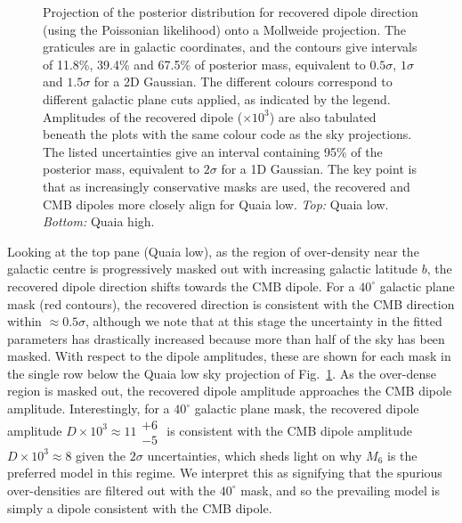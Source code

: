 \documentclass[fleqn,usenatbib]{mnras}
\begin{document}
\begin{figure}
{\begin{tabular}
            \end{tabular}
        }\vspace{2mm}
        \caption{Projection of the posterior distribution for recovered dipole direction (using the Poissonian likelihood) onto a Mollweide projection. The graticules are in galactic coordinates, and the contours give intervals of 11.8\%, 39.4\% and 67.5\% of posterior mass, equivalent to $0.5\sigma$, $1\sigma$ and $1.5\sigma$ for a 2D Gaussian. The different colours correspond to different galactic plane cuts applied, as indicated by the legend. Amplitudes of the recovered dipole ($\times 10^3$) are also tabulated beneath the plots with the same colour code as the sky projections. The listed uncertainties give an interval containing 95\% of the posterior mass, equivalent to $2\sigma$ for a 1D Gaussian. The key point is that as increasingly conservative masks are used, the recovered and CMB dipoles more closely align for Quaia low. \textit{Top:} Quaia low. \textit{Bottom:} Quaia high.}
        \label{fig:mask-variance}
    \end{figure}
    Looking at the top pane (Quaia low), as the region of over-density near the galactic centre is progressively masked out with increasing galactic latitude $b$, the recovered dipole direction shifts towards the CMB dipole.
    For a $40^\circ$ galactic plane mask (red contours), the recovered direction is consistent with the CMB direction within $\approx 0.5 \sigma$, although we note that at this stage the uncertainty in the fitted parameters has drastically increased because more than half of the sky has been masked.
    With respect to the dipole amplitudes, these are shown for each mask in the single row below the Quaia low sky projection of Fig.~\ref{fig:mask-variance}.
    As the over-dense region is masked out, the recovered dipole amplitude approaches the CMB dipole amplitude.
    Interestingly, for a $40^\circ$ galactic plane mask, the recovered dipole amplitude $D \times 10^3 \approx 11\substack{+6 \\ -5}$ is consistent with the CMB dipole amplitude $D \times 10^3 \approx 8$ given the $2\sigma$ uncertainties, which sheds light on why $M_6$ is the preferred model in this regime.
    We interpret this as signifying that the spurious over-densities are filtered out with the $40^\circ$ mask, and so the prevailing model is simply a dipole consistent with the CMB dipole.
\end{document}
